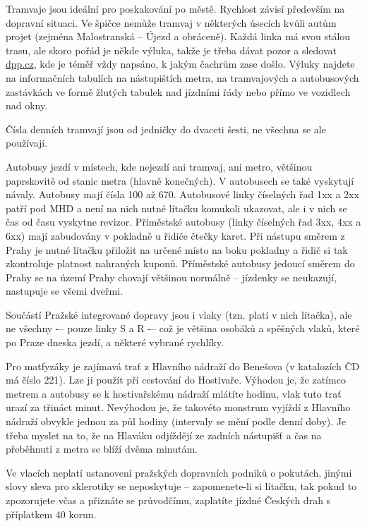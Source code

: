 Tramvaje jsou ideální pro poskakování po městě. Rychlost závisí
především na dopravní situaci. Ve špičce nemůže tramvaj v některých úsecích
kvůli autům projet (zejména Malostranská -- Újezd a obráceně). Každá linka má
svou stálou trasu, ale skoro pořád je někde výluka, takže je třeba dávat pozor a
sledovat \url{dpp.cz}, kde je téměř vždy napsáno, k jakým čachrům zase došlo. Výluky
najdete na informačních tabulích na nástupištích metra, na tramvajových a
autobusových zastávkách ve formě žlutých tabulek nad jízdními řády nebo přímo ve
vozidlech nad okny.

Čísla denních tramvají jsou od jedničky do dvaceti šesti, ne všechna se ale
používají.

Autobusy jezdí v místech, kde nejezdí ani tramvaj, ani metro, většinou
paprskovitě od stanic metra (hlavně konečných). V autobusech se také vyskytují
návaly. Autobusy mají čísla 100 až 670. Autobusové linky číselných řad 1xx a 2xx
patří pod MHD a není na nich nutné lítačku komukoli ukazovat, ale i v nich se
čas od času vyskytne revizor. Příměstské autobusy (linky číselných řad 3xx, 4xx
a 6xx) mají zabudovány v pokladně u řidiče čtečky karet. Při nástupu směrem z
Prahy je nutné lítačku přiložit na určené místo na boku pokladny a řidič si tak
zkontroluje platnost nahraných kuponů. Příměstské autobusy jedoucí směrem do
Prahy se na území Prahy chovají většinou normálně – jízdenky se neukazují,
nastupuje se všemi dveřmi.

Součástí Pražské integrované dopravy jsou i vlaky (tzn. platí v nich lítačka),
ale ne všechny -– pouze linky S a R -– což je většina osobáků a spěšných vlaků,
které po Praze dneska jezdí, a některé vybrané rychlíky. 

Pro matfyzáky je zajímavá trať z Hlavního nádraží do Benešova (v katalozích ČD
má číslo 221). Lze ji použít při cestování do Hostivaře. Výhodou je, že zatímco
metrem a autobusy se k hostivařskému nádraží mlátíte hodinu, vlak tuto trať
urazí za třináct minut. Nevýhodou je, že takovéto monstrum vyjíždí z Hlavního
nádraží obvykle jednou za půl hodiny (intervaly se mění podle denní doby). Je
třeba myslet na to, že na Hlaváku odjíždějí ze zadních nástupišť a čas na
přeběhnutí z metra se blíží dvěma minutám.

Ve vlacích neplatí ustanovení pražských dopravních podniků o pokutách, jinými
slovy sleva pro sklerotiky se neposkytuje -- zapomenete-li si lítačku, tak pokud
to zpozorujete včas a přiznáte se průvodčímu, zaplatíte jízdné Českých drah s
příplatkem 40 korun.

